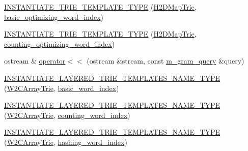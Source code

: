 \begin{DoxyCompactItemize}
\item 
\hyperlink{namespaceuva_1_1smt_1_1bpbd_1_1server_1_1lm_ae32f3a93102b1ae573071c68e76e92e3}{I\+N\+S\+T\+A\+N\+T\+I\+A\+T\+E\+\_\+\+T\+R\+I\+E\+\_\+\+T\+E\+M\+P\+L\+A\+T\+E\+\_\+\+T\+Y\+P\+E} (\hyperlink{classuva_1_1smt_1_1bpbd_1_1server_1_1lm_1_1_h2_d_map_trie}{H2\+D\+Map\+Trie}, \hyperlink{namespaceuva_1_1smt_1_1bpbd_1_1server_1_1lm_1_1dictionary_a3001583c904eec702b4a4125082a7ecd}{basic\+\_\+optimizing\+\_\+word\+\_\+index})
\item 
\hyperlink{namespaceuva_1_1smt_1_1bpbd_1_1server_1_1lm_a43e6ab8cf14ee66dd013f7f86934be7d}{I\+N\+S\+T\+A\+N\+T\+I\+A\+T\+E\+\_\+\+T\+R\+I\+E\+\_\+\+T\+E\+M\+P\+L\+A\+T\+E\+\_\+\+T\+Y\+P\+E} (\hyperlink{classuva_1_1smt_1_1bpbd_1_1server_1_1lm_1_1_h2_d_map_trie}{H2\+D\+Map\+Trie}, \hyperlink{namespaceuva_1_1smt_1_1bpbd_1_1server_1_1lm_1_1dictionary_a61cbd647b15de785ccf4cdd26661c366}{counting\+\_\+optimizing\+\_\+word\+\_\+index})
\item 
ostream \& \hyperlink{namespaceuva_1_1smt_1_1bpbd_1_1server_1_1lm_abcfabc5573e470b2435096fbb70b0822}{operator$<$$<$} (ostream \&stream, const \hyperlink{classuva_1_1smt_1_1bpbd_1_1server_1_1lm_1_1m__gram__query}{m\+\_\+gram\+\_\+query} \&query)
\item 
\hyperlink{namespaceuva_1_1smt_1_1bpbd_1_1server_1_1lm_af862107f4ee7f7d5ac9e16cf4bafebbd}{I\+N\+S\+T\+A\+N\+T\+I\+A\+T\+E\+\_\+\+L\+A\+Y\+E\+R\+E\+D\+\_\+\+T\+R\+I\+E\+\_\+\+T\+E\+M\+P\+L\+A\+T\+E\+S\+\_\+\+N\+A\+M\+E\+\_\+\+T\+Y\+P\+E} (\hyperlink{classuva_1_1smt_1_1bpbd_1_1server_1_1lm_1_1_w2_c_array_trie}{W2\+C\+Array\+Trie}, \hyperlink{classuva_1_1smt_1_1bpbd_1_1server_1_1lm_1_1dictionary_1_1basic__word__index}{basic\+\_\+word\+\_\+index})
\item 
\hyperlink{namespaceuva_1_1smt_1_1bpbd_1_1server_1_1lm_ab8549a39528338d6e7d96a34b43bf364}{I\+N\+S\+T\+A\+N\+T\+I\+A\+T\+E\+\_\+\+L\+A\+Y\+E\+R\+E\+D\+\_\+\+T\+R\+I\+E\+\_\+\+T\+E\+M\+P\+L\+A\+T\+E\+S\+\_\+\+N\+A\+M\+E\+\_\+\+T\+Y\+P\+E} (\hyperlink{classuva_1_1smt_1_1bpbd_1_1server_1_1lm_1_1_w2_c_array_trie}{W2\+C\+Array\+Trie}, \hyperlink{classuva_1_1smt_1_1bpbd_1_1server_1_1lm_1_1dictionary_1_1counting__word__index}{counting\+\_\+word\+\_\+index})
\item 
\hyperlink{namespaceuva_1_1smt_1_1bpbd_1_1server_1_1lm_a085d3ed1d793b1751c97665cf3f58c2b}{I\+N\+S\+T\+A\+N\+T\+I\+A\+T\+E\+\_\+\+L\+A\+Y\+E\+R\+E\+D\+\_\+\+T\+R\+I\+E\+\_\+\+T\+E\+M\+P\+L\+A\+T\+E\+S\+\_\+\+N\+A\+M\+E\+\_\+\+T\+Y\+P\+E} (\hyperlink{classuva_1_1smt_1_1bpbd_1_1server_1_1lm_1_1_w2_c_array_trie}{W2\+C\+Array\+Trie}, \hyperlink{classuva_1_1smt_1_1bpbd_1_1server_1_1lm_1_1dictionary_1_1hashing__word__index}{hashing\+\_\+word\+\_\+index})

\end{DoxyCompactItemize}
